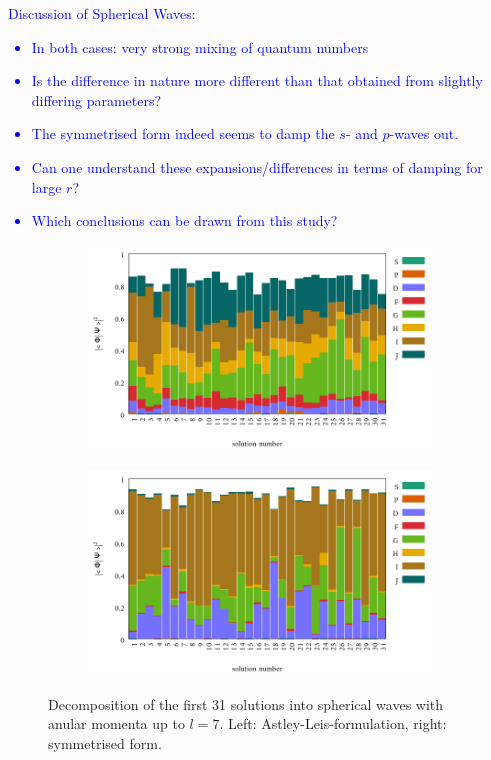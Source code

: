 \textcolor{blue}{Discussion of Spherical Waves:
\begin{itemize}
   \item In both cases: very strong mixing of quantum numbers
   \item Is the difference in nature more different than that obtained from slightly
         differing parameters?
   \item The symmetrised form indeed seems to damp the $s$- and $p$-waves out.
   \item Can one understand these expansions/differences in terms of damping for large $r$?
   \item Which conclusions can be drawn from this study?
\end{itemize}}
\begin{figure}
\begin{subfigure}{0.5\textwidth}
\includegraphics[width=\textwidth]{Figures/Ifem_form_init}
\end{subfigure}
\begin{subfigure}{0.5\textwidth}
\includegraphics[width=\textwidth]{Figures/Ifem_form_symm}
\end{subfigure}
\caption{Decomposition of the first 31 solutions into spherical waves with anular momenta up to $l=7$.
Left: Astley-Leis-formulation, right: symmetrised form.}
\label{fig:IFEMform_project}
\end{figure}

